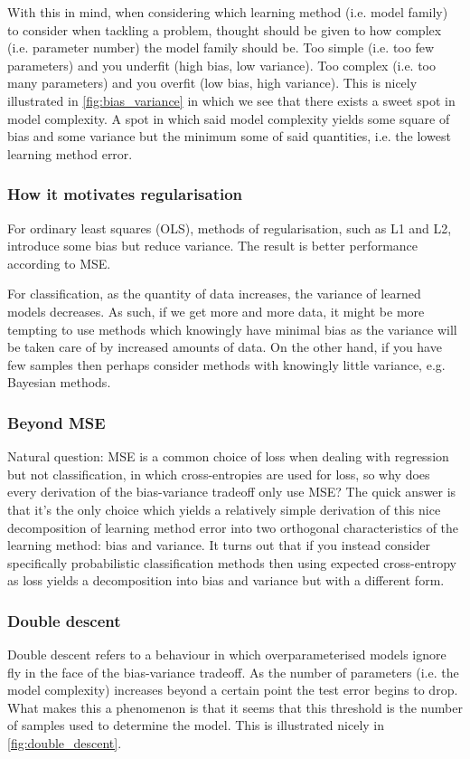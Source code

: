 \documentclass[11pt]{article}
\begin{document}
With this in mind, when considering which learning method (i.e. model family) to consider when tackling a problem, thought should be given to how complex (i.e. parameter number) the model family should be. Too simple (i.e. too few parameters) and you underfit (high bias, low variance). Too complex (i.e. too many parameters) and you overfit (low bias, high variance). This is nicely illustrated in \autoref{fig:bias_variance} in which we see that there exists a sweet spot in model complexity. A spot in which said model complexity yields some square of bias and some variance but the minimum some of said quantities, i.e. the lowest learning method error.

\subsubsection{How it motivates regularisation \TODO{}}
For ordinary least squares (OLS), methods of regularisation, such as L1 and L2, introduce some bias but reduce variance. The result is better performance according to MSE.

For classification, as the quantity of data increases, the variance of learned models decreases. As such, if we get more and more data, it might be more tempting to use methods which knowingly have minimal bias as the variance will be taken care of by increased amounts of data. On the other hand, if you have few samples then perhaps consider methods with knowingly little variance, e.g. Bayesian methods.

\subsubsection{Beyond MSE}
Natural question: MSE is a common choice of loss when dealing with regression but not classification, in which cross-entropies are used for loss, so why does every derivation of the bias-variance tradeoff only use MSE? The quick answer is that it's the only choice which yields a relatively simple derivation of this nice decomposition of learning method error into two orthogonal characteristics of the learning method: bias and variance. It turns out that if you instead consider specifically probabilistic classification methods then using expected cross-entropy as loss yields a decomposition into bias and variance but with a different form.

\subsubsection{Double descent}
Double descent refers to a behaviour in which overparameterised models ignore fly in the face of the bias-variance tradeoff. As the number of parameters (i.e. the model complexity) increases beyond a certain point the test error begins to drop. What makes this a phenomenon is that it seems that this threshold is the number of samples used to determine the model. This is illustrated nicely in \autoref{fig:double_descent}.
\end{document}
